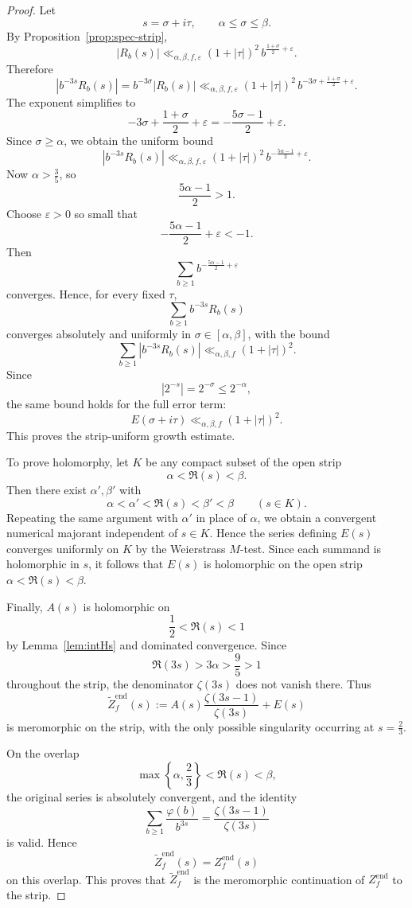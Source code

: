 \documentclass[a4paper,american,11pt]{amsart}
\theoremstyle{plain}
\theoremstyle{definition}
\begin{document}
\begin{proof}
Let
\[
s=\sigma+i\tau,\qquad \alpha\le \sigma\le \beta.
\]
By Proposition~\ref{prop:spec-strip},
\[
|R_b(s)|
\ll_{\alpha,\beta,f,\varepsilon}
(1+|\tau|)^2\,b^{\frac{1+\sigma}{2}+\varepsilon}.
\]
Therefore
\[
|b^{-3s}R_b(s)|
=
b^{-3\sigma}|R_b(s)|
\ll_{\alpha,\beta,f,\varepsilon}
(1+|\tau|)^2\,b^{-3\sigma+\frac{1+\sigma}{2}+\varepsilon}.
\]
The exponent simplifies to
\[
-3\sigma+\frac{1+\sigma}{2}+\varepsilon
=
-\frac{5\sigma-1}{2}+\varepsilon.
\]
Since \(\sigma\ge \alpha\), we obtain the uniform bound
\[
|b^{-3s}R_b(s)|
\ll_{\alpha,\beta,f,\varepsilon}
(1+|\tau|)^2\,b^{-\frac{5\alpha-1}{2}+\varepsilon}.
\]
Now \(\alpha>\tfrac35\), so
\[
\frac{5\alpha-1}{2}>1.
\]
Choose \(\varepsilon>0\) so small that
\[
-\frac{5\alpha-1}{2}+\varepsilon<-1.
\]
Then
\[
\sum_{b\ge1} b^{-\frac{5\alpha-1}{2}+\varepsilon}
\]
converges. Hence, for every fixed \(\tau\),
\[
\sum_{b\ge1} b^{-3s}R_b(s)
\]
converges absolutely and uniformly in \(\sigma\in[\alpha,\beta]\), with the bound
\[
\sum_{b\ge1}|b^{-3s}R_b(s)|
\ll_{\alpha,\beta,f}
(1+|\tau|)^2.
\]
Since
\[
|2^{-s}|=2^{-\sigma}\le 2^{-\alpha},
\]
the same bound holds for the full error term:
\[
E(\sigma+i\tau)\ll_{\alpha,\beta,f}(1+|\tau|)^2.
\]
This proves the strip-uniform growth estimate.

To prove holomorphy, let \(K\) be any compact subset of the open strip
\[
\alpha<\Re(s)<\beta.
\]
Then there exist \(\alpha',\beta'\) with
\[
\alpha<\alpha'<\Re(s)<\beta'<\beta
\qquad (s\in K).
\]
Repeating the same argument with \(\alpha'\) in place of \(\alpha\), we obtain a convergent
numerical majorant independent of \(s\in K\). Hence the series defining \(E(s)\) converges
uniformly on \(K\) by the Weierstrass \(M\)-test. Since each summand is holomorphic in \(s\),
it follows that \(E(s)\) is holomorphic on the open strip \(\alpha<\Re(s)<\beta\).

Finally, \(A(s)\) is holomorphic on
\[
\frac12<\Re(s)<1
\]
by Lemma~\ref{lem:intHs} and dominated convergence. Since
\[
\Re(3s)>3\alpha>\frac95>1
\]
throughout the strip, the denominator \(\zeta(3s)\) does not vanish there.
Thus
\[
\widetilde Z_f^{\mathrm{end}}(s)
:=
A(s)\frac{\zeta(3s-1)}{\zeta(3s)}+E(s)
\]
is meromorphic on the strip, with the only possible singularity occurring
at \(s=\frac23\).

On the overlap
\[
\max\left\{\alpha,\frac23\right\}<\Re(s)<\beta,
\]
the original series is absolutely convergent, and the identity
\[
\sum_{b\ge1}\frac{\varphi(b)}{b^{3s}}
=
\frac{\zeta(3s-1)}{\zeta(3s)}
\]
is valid. Hence
\[
\widetilde Z_f^{\mathrm{end}}(s)
=
Z_f^{\mathrm{end}}(s)
\]
on this overlap. This proves that
\(\widetilde Z_f^{\mathrm{end}}\) is the meromorphic continuation of
\(Z_f^{\mathrm{end}}\) to the strip.

\end{proof}
\end{document}

